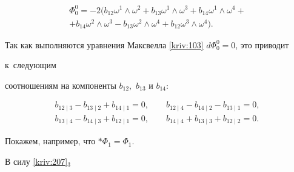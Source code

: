 


\begin{multline}

\Phi _{0}^{0}=-2\bigl( 


b_{12}\omega ^{1}\wedge \omega ^{2}+b_{13}\omega ^{1}\wedge \omega

^{3}+b_{14}\omega ^{1}\wedge \omega ^{4}+ \\ 

+b_{14}\omega ^{2}\wedge \omega ^{3}-b_{13}\omega ^{2}\wedge \omega

^{4}+b_{12}\omega ^{3}\wedge \omega ^{4}


\bigr) .  \label{kriv:210}

\end{multline}



Так как выполняются уравнения Максвелла \eqref{kriv:103} $d\Phi _{0}^{0}=0$,  это приводит 

к~следующим 

соотношениям на компоненты $b_{12},$ $b_{13}$ и $b_{14}$:

\begin{equation}

\begin{array}{c}

b_{12\mid 3}-b_{13\mid 2}+b_{14\mid 1}=0,\qquad b_{12\mid 4}-b_{14\mid

2}-b_{13\mid 1}=0, \\ 

b_{13\mid 4}-b_{14\mid 3}+b_{12\mid 1}=0,\qquad b_{14\mid 4}+b_{13\mid

3}+b_{12\mid 2}=0.\end{array}

\label{kriv:211}

\end{equation}

Покажем, например, что $\ast \Phi _{1}=\Phi _{1}.$ 

В силу \eqref{kriv:207}$_{3}$

